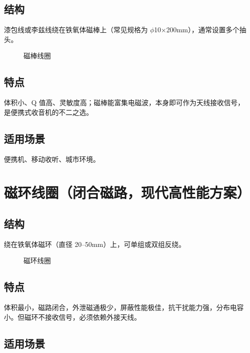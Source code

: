 \documentclass[12pt,UTF8]{ctexbook}
\begin{document}
\subsection{结构}

漆包线或李兹线绕在铁氧体磁棒上（常见规格为 $\phi$10×200mm），通常设置多个抽头。

\begin{figure}[H]
	\centering
	\caption{磁棒线圈}
	\label{fig:ferrite-rod-coil}
\end{figure}

\subsection{特点}

体积小、Q 值高、灵敏度高；磁棒能富集电磁波，本身即可作为天线接收信号，是便携式收音机的不二之选。

\subsection{适用场景}

便携机、移动收听、城市环境。


\section{磁环线圈（闭合磁路，现代高性能方案）}

\subsection{结构}

绕在铁氧体磁环（直径 20–50mm）上，可单组或双组反绕。

\begin{figure}[H]
	\centering
	\caption{磁环线圈}
	\label{fig:toroidal-coil}
\end{figure}

\subsection{特点}

体积最小，磁路闭合，外泄磁通极少，屏蔽性能极佳，抗干扰能力强，分布电容小。但磁环不接收信号，必须依赖外接天线。

\subsection{适用场景}
\end{document}
